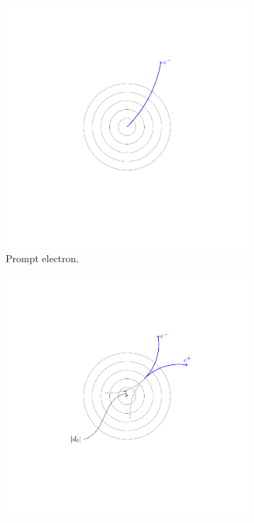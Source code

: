 \begin{figure}[htbp]
  \centering
  \begin{subfigure}{0.49\textwidth}
    \centering
    \includegraphics[trim = 35mm 40mm 30mm 30mm, clip,width=\textwidth]{doca_electron}
    \caption{Prompt electron.}
    \label{fig:electron_path}
  \end{subfigure}
  \begin{subfigure}{0.49\textwidth}
    \centering
    \includegraphics[trim = 35mm 40mm 30mm 30mm, clip,width=\textwidth]{doca}

\end{subfigure}
\end{figure}
